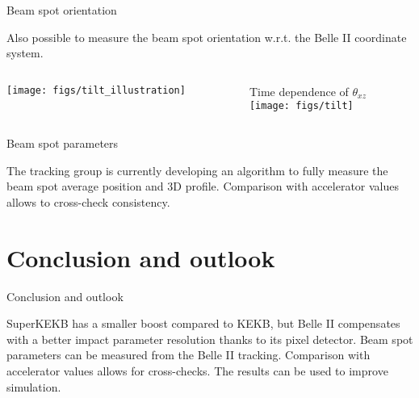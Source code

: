 \begin{frame}{Beam spot orientation}
\bi
\item {Also possible to measure the beam spot orientation w.r.t. the Belle II coordinate system.}
\vspace{0.5cm}
\ei
\begin{columns}
\begin{column}{0.2\linewidth}
\centering
\texttt{[image: figs/tilt\_illustration]} 
\end{column}
\begin{column}{0.8\linewidth}
\centering
Time dependence of $\theta_{xz}$\\
\vspace{0.5cm}
\texttt{[image: figs/tilt]} 
\end{column}
\end{columns}
\end{frame}
\begin{frame}{Beam spot parameters}
\bi
\item The tracking group is currently developing an algorithm to fully measure the beam spot average position and 3D profile.
\itemi Comparison with accelerator values allows to cross-check consistency. 
\vspace{0.5cm}
\ei
\centering

\end{frame}
\section{Conclusion and outlook}
\begin{frame}{Conclusion and outlook}
\bi
\item SuperKEKB has a smaller boost compared to KEKB, but Belle II compensates with a better impact parameter resolution thanks to its pixel detector.
\itemi Beam spot parameters can be measured from the Belle II tracking.
\bi
\itemii Comparison with accelerator values allows for cross-checks.
\itemii The results can be used to improve simulation.
\ei
\ei
\end{frame}

